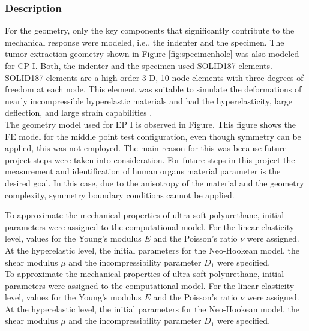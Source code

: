 \subsubsection*{Description}

For the geometry, only the key components that significantly contribute to the mechanical response were modeled, 
i.e., the indenter and the specimen. The tumor extraction geometry shown in Figure \ref{fig:specimenhole}
was also modeled for CP I. Both, the indenter and the specimen used SOLID187 elements. 
SOLID187 elements are a high order 3-D, 10 node elements with three degrees of freedom at each node. 
This element was suitable to simulate the deformations of nearly incompressible hyperelastic materials 
and had the hyperelasticity, large deflection, and large strain capabilities \cite{Ansys2010}.\\

The geometry model used for EP I is observed in Figure. %
This figure shows the FE model for the middle point test configuration, even though symmetry can be applied, this was 
not employed. The main reason for this was because future project steps were taken into consideration. 
For future steps in this project the measurement and identification of human organs material parameter 
is the desired goal. In this case, due to the anisotropy of the material and the geometry complexity,
symmetry boundary conditions cannot be applied. 

To approximate the mechanical properties of ultra-soft polyurethane, initial parameters were assigned 
to the computational model. For the linear elasticity level, values for the Young's modulus $E$ and the 
Poisson's ratio $\nu$ were assigned. At the hyperelastic level, the initial parameters for the Neo-Hookean model, 
the shear modulus $\mu$ and the incompressibility parameter $D_1$ were specified.\\ 


To approximate the mechanical properties of ultra-soft polyurethane, initial parameters were assigned 
to the computational model. For the linear elasticity level, values for the Young's modulus $E$ and the 
Poisson's ratio $\nu$ were assigned. At the hyperelastic level, the initial parameters for the Neo-Hookean model, 
the shear modulus $\mu$ and the incompressibility parameter $D_1$ were specified.\\ 

